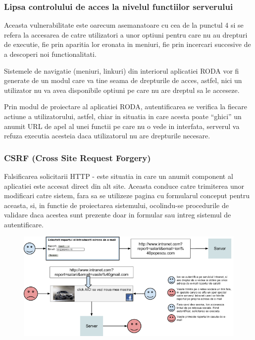\subsubsection{Lipsa controlului de acces la nivelul functiilor serverului}

Aceasta vulnerabilitate este oarecum asemanatoare cu cea de la punctul 4 si se refera la accesarea de catre utilizatori
a unor optiuni pentru care nu au drepturi de executie, fie prin aparitia lor eronata in meniuri, fie prin incercari
succesive de a descoperi noi functionalitati.

Sistemele de navigatie (meniuri, linkuri) din interiorul aplicatiei RODA vor fi generate de un modul care va tine seama
de drepturile de acces, astfel, nici un utilizator nu va avea disponibile optiuni pe care nu are dreptul sa le
acceseze.

Prin modul de proiectare al aplicatiei RODA, autentificarea se verifica la fiecare actiune a utilizatorului, astfel,
chiar in situatia in care acesta poate ``ghici'' un anumit URL de apel al unei
functii pe care nu o vede in interfata, serverul va refuza executia acesteia daca utilizatorul nu are drepturile necesare.

\subsubsection{CSRF (Cross Site Request Forgery)}

Falsificarea solicitarii HTTP - este situatia in care un anumit component al aplicatiei este accesat direct din alt
site. Aceasta conduce catre trimiterea unor modificari catre sistem, fara sa se utilizeze pagina cu formularul conceput
pentru aceasta, si, in functie de proiectarea sistemului, ocolindu-se procedurile de validare daca acestea sunt
prezente doar in formular sau intreg sistemul de autentificare.

\begin{figure}[hbt]
\centering
\includegraphics[width=\textwidth]{SecuritateaarhiveiRODA-img005.png} 
\label{fig:img005}
\end{figure}

